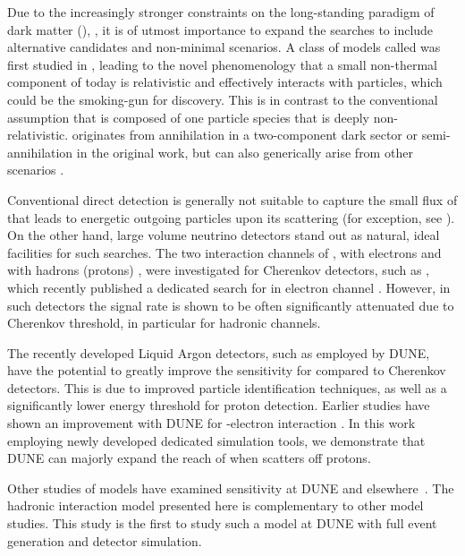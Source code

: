 Due to the increasingly stronger constraints on the long-standing paradigm of dark matter (), , it is of utmost importance to expand the  searches to include alternative candidates and non-minimal scenarios. A class of models called  was first studied in \cite{Huang:2013xfa,Agashe:2014yua, Berger:2014sqa}, leading to the novel phenomenology that a small non-thermal component of  today is relativistic and effectively interacts with  particles, which could %
be the smoking-gun for  discovery. This is in contrast to the conventional assumption that  is composed of one particle species that is deeply non-relativistic.  originates from  annihilation in a two-component dark sector or semi-annihilation in the original work, but can also generically arise from other scenarios \cite{Carlson:1992fn, Hochberg:2014dra,Huang:2013xfa}. 

Conventional  direct detection is generally not suitable to capture the small flux of  that leads to energetic outgoing  particles upon its scattering (for exception, see \cite{Cherry:2015oca, Cui:2017ytb}). On the other hand, large volume neutrino detectors stand out as natural, ideal facilities for such searches. The two interaction channels of , with electrons \cite{Agashe:2014yua} and with hadrons (protons) \cite{Berger:2014sqa}, were investigated for Cherenkov detectors, such as \superk, which recently published a dedicated search for  in electron channel \cite{Kachulis:2017nci}. However, in such detectors the  signal rate is shown to be often significantly attenuated due to Cherenkov threshold, in particular for hadronic channels. 

The recently developed Liquid Argon detectors, such as employed by DUNE, have the potential to greatly improve the sensitivity for  compared to Cherenkov detectors. This is due to improved particle identification techniques, as well as a significantly lower energy threshold for proton detection. Earlier studies have shown an improvement with DUNE for -electron interaction \cite{Necib:2016aez}. In this work employing newly developed dedicated simulation tools, we demonstrate that DUNE can majorly expand the reach of \superk when  scatters off protons.

Other studies of  models have examined sensitivity at DUNE and elsewhere~\cite{Agashe:2014yua,Berger:2014sqa,Alhazmi:2016qcs,Necib:2016aez,Kim:2016zjx,Kachulis:2017nci,Giudice:2017zke,Chatterjee:2018mej,Kim:2018veo}. The hadronic interaction model presented here is complementary to other model studies. This study is the first to study such a model at DUNE with full event generation and detector simulation.


